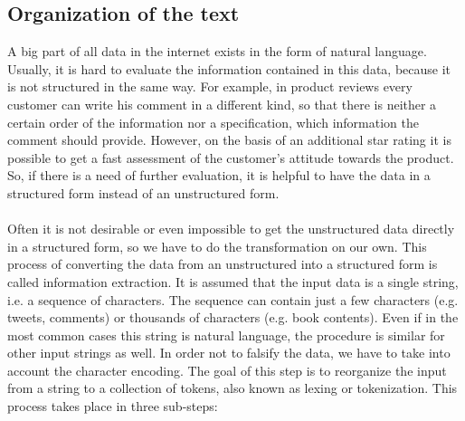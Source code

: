 \documentclass[article,type=msc,colorback,accentcolor=tud7b]{tudthesis}
\begin{document}
  \subsection{Organization of the text}
    A big part of all data in the internet exists in the form of natural language. Usually, it is hard to evaluate the information contained in this data, because it is not structured in the same way. For example, in product reviews every customer can write his comment in a different kind, so that there is neither a certain order of the information nor a specification, which information the comment should provide. However, on the basis of an additional star rating it is possible to get a fast assessment of the customer’s attitude towards the product. So, if there is a need of further evaluation, it is helpful to have the data in a structured form instead of an unstructured form. \\\\
    Often it is not desirable or even impossible to get the unstructured data directly in a structured form, so we have to do the transformation on our own. This process of converting the data from an unstructured into a structured form is called information extraction. It is assumed that the input data is a single string, i.e. a sequence of characters. The sequence can contain just a few characters (e.g. tweets, comments) or thousands of characters (e.g. book contents). Even if in the most common cases this string is natural language, the procedure is similar for other input strings as well. In order not to falsify the data, we have to take into account the character encoding. The goal of this step is to reorganize the input from a string to a collection of tokens, also known as lexing or tokenization. This process takes place in three sub-steps:
\end{document}
